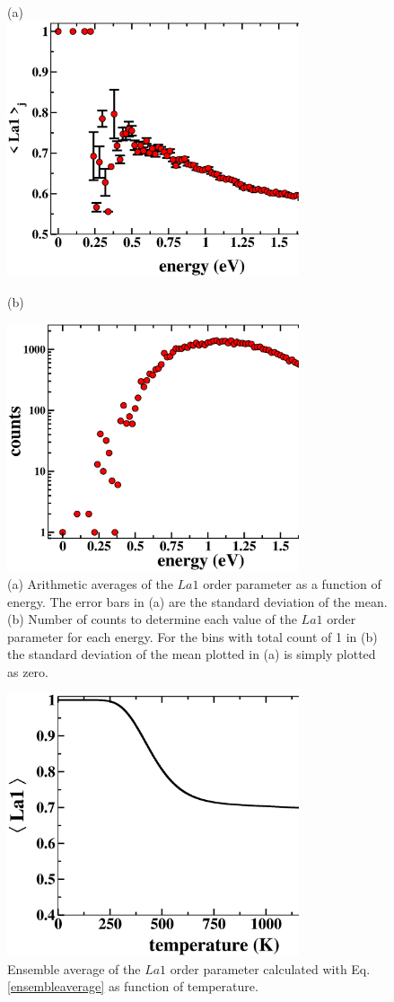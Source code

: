 \documentclass[aps,pre,reprint,superscriptaddress,showkeys]{revtex4-1}
\begin{document}
\begin{figure}[h!]
(a)\\
\includegraphics[width=8.6cm]{fig8a.eps}\\
\centerline{(b)}
\includegraphics[width=8.6cm]{fig8b.eps}
\caption{(a) Arithmetic averages of the $La1$ order parameter as a function of energy. The error bars in (a) are the standard deviation of the mean.  (b) Number of counts to determine each value of the $La1$ order parameter for each energy. For the bins with total count of 1 in (b) the standard deviation of the mean plotted in (a) is simply plotted as zero.  \label{arithemetic_avg}}
\end{figure}

\begin{figure}[h!]
\includegraphics[width=8.6cm]{fig9.eps}
\caption{Ensemble average of the $La1$ order parameter calculated with Eq. \ref{ensembleaverage} as function of temperature. \label{ensembleOP}}
\end{figure}
\end{document}
